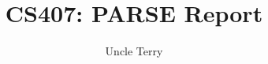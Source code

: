 \documentclass[11pt]{article}
\begin{document}
\title{CS407: PARSE Report} 
\author{Uncle Terry}
\maketitle
\thispagestyle{empty}
\newpage


\newpage

\newpage

\newpage

\newpage

\newpage

\newpage



\end{document}
